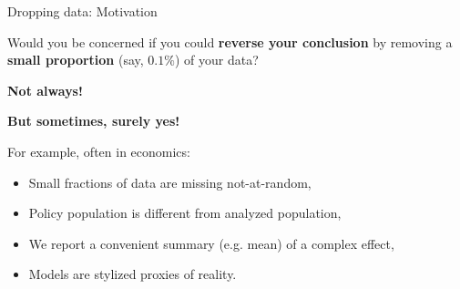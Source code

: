 
\begin{frame}{Dropping data: Motivation}

Would you be concerned if you could \textbf{reverse your conclusion} by removing
a \textbf{small proportion} (say, $0.1\%$) of your data?

\pause
\textbf{Not always!}


\pause
\textbf{But sometimes, surely yes!}

For example, often in economics:
%
\begin{itemize}
\item Small fractions of data are missing not-at-random,
\item Policy population is different from analyzed population,
\item We report a convenient summary (e.g. mean) of a complex effect,
\item Models are stylized proxies of reality.
\end{itemize}


\end{frame}



